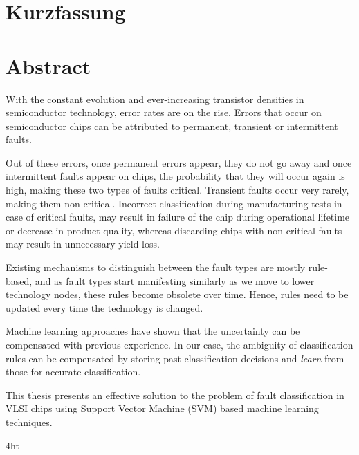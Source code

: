 \documentclass[
               paper=a4,
               BCOR1.92mm,DIV12,headinclude, %
               titlepage,
               bibliography=totoc,
               headsepline,
               cleardoublepage=empty,
               parskip=half,
	       pointlessnumbers, %
               final   %
               ]{scrreprt}
\let\ifdeutsch\iffalse
\begin{document}
\ifdeutsch
\chapter*{Kurzfassung}
\else
\chapter*{Abstract}
\fi
\begin{spacing}{1.5} 
With the constant evolution and ever-increasing transistor densities in semiconductor technology, error rates are on the rise. Errors that occur on semiconductor chips can be attributed to permanent, transient or intermittent faults.

Out of these errors, once permanent errors appear, they do not go away and once intermittent faults appear on chips, the probability that they will occur again is high, making these two types of faults critical. Transient faults occur very rarely, making them non-critical. Incorrect classification during manufacturing tests in case of critical faults, may result in failure of the chip during operational lifetime or decrease in product quality, whereas discarding chips with non-critical faults may result in unnecessary yield loss.

Existing mechanisms to distinguish between the fault types are mostly rule-based, and as fault types start manifesting similarly as we move to lower technology nodes, these rules become obsolete over time. Hence, rules need to be updated every time the technology is changed.

Machine learning approaches have shown that the uncertainty can be compensated with previous experience. In our case, the ambiguity of classification rules can be compensated by storing past classification decisions and \emph{learn} from those for accurate classification. 

This thesis presents an effective solution to the problem of fault classification in VLSI chips using Support Vector Machine (SVM) based machine learning techniques.

\end{spacing}
\cleardoublepage



\iftex4ht
\else
{}
\fi

%
%
\end{document}
